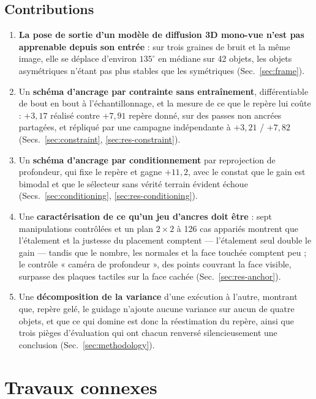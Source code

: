 \documentclass[conference]{IEEEtran}
\begin{document}
\subsection{Contributions}
\begin{enumerate}
  \item \textbf{La pose de sortie d'un modèle de diffusion 3D mono-vue n'est pas
  apprenable depuis son entrée} : sur trois graines de bruit et la même image, elle se
  déplace d'environ $135^\circ$ en médiane sur 42 objets, les objets asymétriques n'étant pas
  plus stables que les symétriques (Sec.~\ref{sec:frame}).
  \item Un \textbf{schéma d'ancrage par contrainte sans entraînement}, différentiable
  de bout en bout à l'échantillonnage, et la mesure de ce que le repère lui coûte :
  $+3{,}17$ réalisé contre $+7{,}91$ repère donné, sur des passes non ancrées
  partagées, et répliqué par une campagne indépendante à $+3{,}21$ / $+7{,}82$
  (Secs.~\ref{sec:constraint}, \ref{sec:res-constraint}).
  \item Un \textbf{schéma d'ancrage par conditionnement} par reprojection de
  profondeur, qui fixe le repère et gagne $+11{,}2$, avec le constat que le gain est
  bimodal et que le sélecteur sans vérité terrain évident échoue
  (Secs.~\ref{sec:conditioning}, \ref{sec:res-conditioning}).
  \item Une \textbf{caractérisation de ce qu'un jeu d'ancres doit être} : sept
  manipulations contrôlées et un plan $2\times2$ à 126 cas appariés montrent que
  l'étalement et la justesse du placement comptent --- l'étalement seul double le gain
  --- tandis que le nombre, les normales et la face touchée comptent peu ; le contrôle
  « caméra de profondeur », des points couvrant la face visible, surpasse des plaques
  tactiles sur la face cachée (Sec.~\ref{sec:res-anchor}).
  \item Une \textbf{décomposition de la variance} d'une exécution à l'autre, montrant
  que, repère gelé, le guidage n'ajoute aucune variance sur aucun de quatre objets, et
  que ce qui domine est donc la réestimation du repère, ainsi que trois pièges
  d'évaluation qui ont chacun renversé silencieusement une conclusion
  (Sec.~\ref{sec:methodology}).
\end{enumerate}

\section{Travaux connexes}
\end{document}
